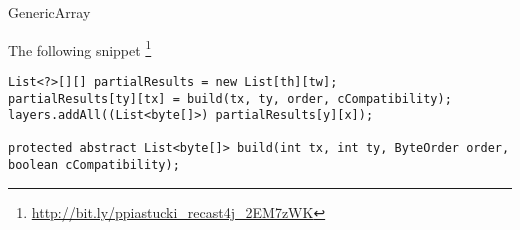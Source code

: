 \begin{pattern}{GenericArray}

\instances{}
The following snippet%
\footnote{\url{http://bit.ly/ppiastucki_recast4j_2EM7zWK}}

\begin{verbatim}
List<?>[][] partialResults = new List[th][tw];
partialResults[ty][tx] = build(tx, ty, order, cCompatibility);
layers.addAll((List<byte[]>) partialResults[y][x]);

protected abstract List<byte[]> build(int tx, int ty, ByteOrder order, boolean cCompatibility);

\end{verbatim}

\detection{}

\discussion{}

\related{}

\end{pattern}